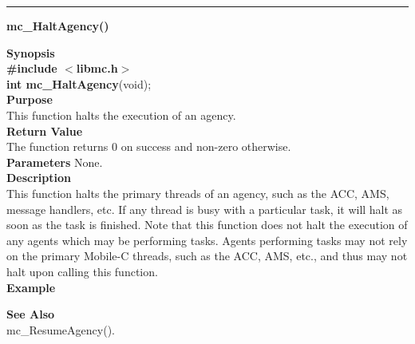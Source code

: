 \noindent
\vspace{5pt}
\rule{6.5in}{0.015in}
\noindent
{}
{\LARGE \bf mc\_HaltAgency()}\\
\label{api:mc_HaltAgency()}

\noindent
{\bf Synopsis}\\
{\bf \#include $<$libmc.h$>$}\\
{\bf int mc\_HaltAgency}({void});\\

\noindent
{\bf Purpose}\\
This function halts the execution of an agency. \\

\noindent
{\bf Return Value}\\
The function returns 0 on success and non-zero otherwise.\\

\noindent
{\bf Parameters}
None.\\

\noindent
{\bf Description}\\
This function halts the primary threads of an agency, such as the ACC, AMS,
message handlers, etc. If any thread is busy with
a particular task, it will halt as soon as the task is finished. Note that
this function does not halt the execution of any agents which may be 
performing tasks. Agents performing tasks may not rely on the primary 
Mobile-C threads, such as the ACC, AMS, etc., and thus may not halt upon
calling this function. \\

\noindent
{\bf Example}\\
\noindent

\noindent
{\bf See Also}\\
mc\_ResumeAgency().

